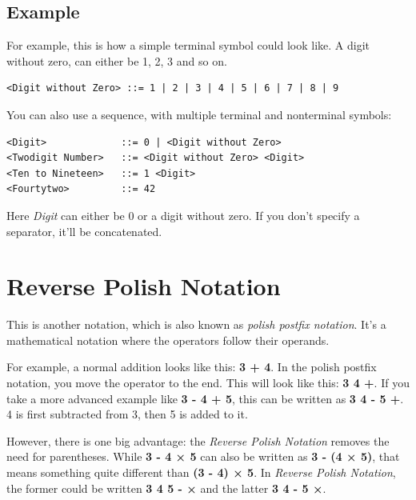 \subsection{Example}

For example, this is how a simple terminal symbol could look like. A digit without zero, can either be 1, 2, 3 and so on. 

\begin{verbatim}
<Digit without Zero> ::= 1 | 2 | 3 | 4 | 5 | 6 | 7 | 8 | 9
\end{verbatim}

You can also use a sequence, with multiple terminal and nonterminal symbols: 

\begin{verbatim}
<Digit>             ::= 0 | <Digit without Zero>
<Twodigit Number>   ::= <Digit without Zero> <Digit>
<Ten to Nineteen>   ::= 1 <Digit>
<Fourtytwo>         ::= 42
\end{verbatim}
    
Here \textit{Digit} can either be 0 or a digit without zero. If you don't specify a separator, it'll be concatenated. 



\section{Reverse Polish Notation}
\label{sec:reverse-polish-notation}

This is another notation, which is also known as \textit{polish postfix notation}. It's a mathematical notation where the operators follow their operands. 

For example, a normal addition looks like this: \textbf{3 + 4}. In the polish postfix notation, you move the operator to the end. This will look like this: \textbf{3 4 +}. If you take a more advanced example like \textbf{3 - 4 + 5}, this can be written as \textbf{3 4 - 5 +}. 4 is first subtracted from 3, then 5 is added to it. 

However, there is one big advantage: the \textit{Reverse Polish Notation} removes the need for parentheses. While \textbf{3 - 4 × 5} can also be written as \textbf{3 - (4 × 5)}, that means something quite different than \textbf{(3 - 4) × 5}. In \textit{Reverse Polish Notation}, the former could be written \textbf{3 4 5 - ×} and the latter \textbf{3 4 - 5 ×}. 

